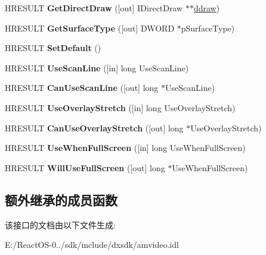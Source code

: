 \begin{DoxyCompactItemize}
H\+R\+E\+S\+U\+LT {\bfseries Get\+Direct\+Draw} (\mbox{[}out\mbox{]} I\+Direct\+Draw $\ast$$\ast$\hyperlink{structddraw}{ddraw})
\item 
\mbox{\label{interface_i_direct_draw_video_a51fa0aba442ec4dcb0830927f903daf3}} 
H\+R\+E\+S\+U\+LT {\bfseries Get\+Surface\+Type} (\mbox{[}out\mbox{]} D\+W\+O\+RD $\ast$p\+Surface\+Type)
\item 
\mbox{\label{interface_i_direct_draw_video_a3dc8b230c0173999993a1e67de02f99e}} 
H\+R\+E\+S\+U\+LT {\bfseries Set\+Default} ()
\item 
\mbox{\label{interface_i_direct_draw_video_a4db621a172f411571b33b503eacc0707}} 
H\+R\+E\+S\+U\+LT {\bfseries Use\+Scan\+Line} (\mbox{[}in\mbox{]} long Use\+Scan\+Line)
\item 
\mbox{\label{interface_i_direct_draw_video_a318dd71014d8160f38eb6f4a8ac689a2}} 
H\+R\+E\+S\+U\+LT {\bfseries Can\+Use\+Scan\+Line} (\mbox{[}out\mbox{]} long $\ast$Use\+Scan\+Line)
\item 
\mbox{\label{interface_i_direct_draw_video_ad20ef710bcf53824945c5d9f44a9984b}} 
H\+R\+E\+S\+U\+LT {\bfseries Use\+Overlay\+Stretch} (\mbox{[}in\mbox{]} long Use\+Overlay\+Stretch)
\item 
\mbox{\label{interface_i_direct_draw_video_a6480ca57d5e45970dd9fabe9e83799ef}} 
H\+R\+E\+S\+U\+LT {\bfseries Can\+Use\+Overlay\+Stretch} (\mbox{[}out\mbox{]} long $\ast$Use\+Overlay\+Stretch)
\item 
\mbox{\label{interface_i_direct_draw_video_af6d7f78d79e513c05adce8d6c040fcb0}} 
H\+R\+E\+S\+U\+LT {\bfseries Use\+When\+Full\+Screen} (\mbox{[}in\mbox{]} long Use\+When\+Full\+Screen)
\item 
\mbox{\label{interface_i_direct_draw_video_a4bc831cb8ea35783f5a8d161c5a69a57}} 
H\+R\+E\+S\+U\+LT {\bfseries Will\+Use\+Full\+Screen} (\mbox{[}out\mbox{]} long $\ast$Use\+When\+Full\+Screen)
\end{DoxyCompactItemize}
\subsection*{额外继承的成员函数}


该接口的文档由以下文件生成\+:\begin{DoxyCompactItemize}
\item 
E\+:/\+React\+O\+S-\/0../sdk/include/dxsdk/amvideo.\+idl\end{DoxyCompactItemize}
